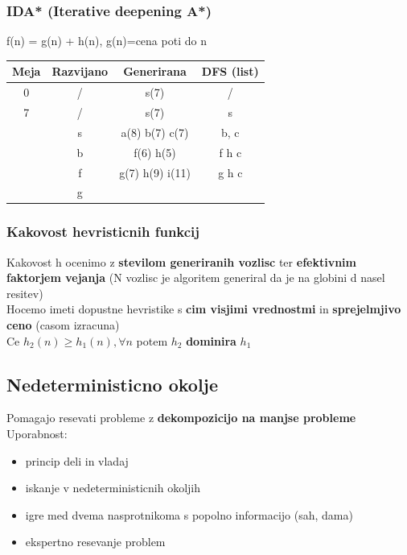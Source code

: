\subsubsection{IDA* (Iterative deepening A*)}
f(n) = g(n) + h(n), g(n)=cena poti do n\\
\begin{tabular}{c|c|c|c}
    Meja & Razvijano & Generirana & DFS (list)\\
    \hline
    0 & / & s(7) & /\\
    \hline
    7 & / & s(7) & s \\
      & s & a(8) b(7) c(7) & b, c\\
      & b & f(6) h(5) & f h c\\
      & f & g(7) h(9) i(11) & g h c\\
      & \underline{g} &  & 
\end{tabular}

\subsubsection{Kakovost hevristicnih funkcij}
Kakovost h ocenimo z \textbf{stevilom generiranih vozlisc} ter \textbf{efektivnim faktorjem vejanja} (N vozlisc je algoritem generiral da je na globini d nasel resitev)\\
Hocemo imeti dopustne hevristike s \textbf{cim visjimi vrednostmi} in \textbf{sprejelmjivo ceno} (casom izracuna)\\
Ce $h_2(n) \geq h_1(n), \forall n$ potem $h_2$ \textbf{dominira} $h_1$

\subsection{Nedeterministicno okolje}
Pomagajo resevati probleme z \textbf{dekompozicijo na manjse probleme}
Uporabnost:
\begin{itemize}[noitemsep,topsep=0pt,leftmargin=*]
    \item princip deli in vladaj
    \item iskanje v nedeterministicnih okoljih 
    \item igre med dvema nasprotnikoma s popolno informacijo (sah, dama)
    \item ekspertno resevanje problem
\end{itemize}

